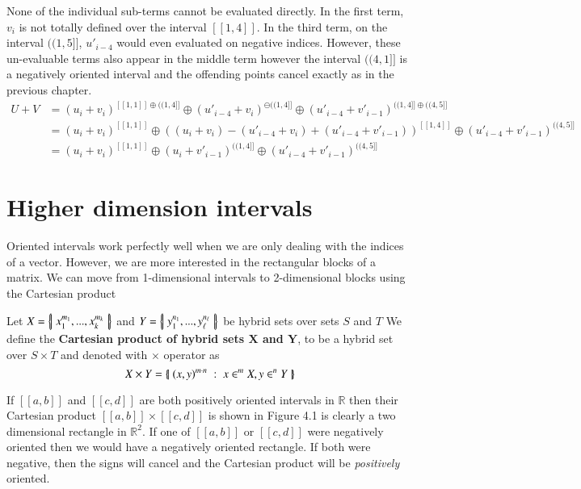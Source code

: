None of the individual sub-terms cannot be evaluated directly.
In the first term, $v_i$ is not totally defined over the interval $[\![1,4]\!]$.
In the third term, on the interval $(\!(1,5]\!]$, $u'_{i-4}$ would even evaluated on negative indices.
However, these un-evaluable terms also appear in the middle term however the interval $(\!(4,1]\!]$ is a negatively oriented
 interval and the offending points cancel exactly as in the previous chapter.
\begin{align*}
	U + V
		&= (u_i + v_i)^{[\![1,1]\!] \oplus (\!(1,4]\!]} 
			\oplus (u'_{i-4} + v_i)^{\ominus(\!(1,4]\!]} 
			\oplus (u'_{i-4} + v'_{i-1})^{(\!(1,4]\!] \oplus (\!(4,5]\!]}\\
		&= (u_i + v_i)^{[\![1,1]\!]} 
			\oplus \left((u_i + v_i) - (u'_{i-4} + v_i) + (u'_{i-4} + v'_{i-1})\right)^{[\![1,4]\!]} 
			\oplus (u'_{i-4} + v'_{i-1})^{(\!(4,5]\!]} \\ 
		&= (u_i + v_i)^{[\![1,1]\!]} 
			\oplus (u_i + v'_{i-1})^{(\!(1,4]\!]} 
			\oplus (u'_{i-4} + v'_{i-1})^{(\!(4,5]\!]}
\end{align*}

%
%

\section{Higher dimension intervals}

Oriented intervals work perfectly well when we are only dealing with the indices of a vector. 
However, we are more interested in the rectangular blocks of a matrix.
We can move from 1-dimensional intervals to 2-dimensional blocks using the Cartesian product
\begin{definition}
	Let $X = \left\{ \! \left| \;  x_1^{m_1}, ... , x_k^{m_k}  \; \right| \! \right\}$ and $Y= \left\{ \! \left| \;  y_1^{n_1}, ... , y_\ell^{n_\ell}  \; \right| \! \right\}$ be hybrid sets
	over sets $S$ and $T$
	We define the \textbf{Cartesian product of hybrid sets $\boldsymbol{X}$ and $\boldsymbol{Y}$}, to be a hybrid set
	over $S \times T$ and denoted with $\times$ operator as
	\begin{equation}
		X \times Y = \left\{ \! \left| \;  (x, y)^{m \cdot n} \; : \; x \in^m X, y \in^n Y  \; \right| \! \right\}
	 \end{equation}
\end{definition}


If $[\![a,b]\!]$ and $[\![c,d]\!]$ are both positively oriented intervals in $\mathbb{R}$ then their Cartesian product 
$[\![a,b]\!] \times [\![c,d]\!]$ is shown in Figure 4.1 is clearly a two dimensional rectangle in $\mathbb{R}^2$.
If one of $[\![a,b]\!]$ or $[\![c,d]\!]$ were negatively oriented then we would have a negatively oriented rectangle.
If both were negative, then the signs will cancel and the Cartesian product will be \emph{positively} oriented.


